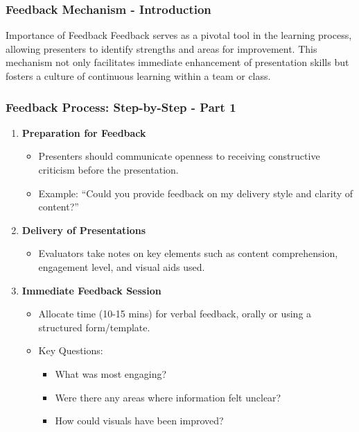 \documentclass[aspectratio=169]{beamer}
\begin{document}
\begin{frame}[fragile]
    \frametitle{Feedback Mechanism - Introduction}
    \begin{block}{Importance of Feedback}
        Feedback serves as a pivotal tool in the learning process, allowing presenters to identify strengths and areas for improvement. This mechanism not only facilitates immediate enhancement of presentation skills but fosters a culture of continuous learning within a team or class.
    \end{block}
\end{frame}

\begin{frame}[fragile]
    \frametitle{Feedback Process: Step-by-Step - Part 1}
    \begin{enumerate}
        \item \textbf{Preparation for Feedback}  
            \begin{itemize}
                \item Presenters should communicate openness to receiving constructive criticism before the presentation.
                \item Example: “Could you provide feedback on my delivery style and clarity of content?”
            \end{itemize}
        
        \item \textbf{Delivery of Presentations}  
            \begin{itemize}
                \item Evaluators take notes on key elements such as content comprehension, engagement level, and visual aids used.
            \end{itemize}
        
        \item \textbf{Immediate Feedback Session}  
            \begin{itemize}
                \item Allocate time (10-15 mins) for verbal feedback, orally or using a structured form/template.
                \item Key Questions:
                    \begin{itemize}
                        \item What was most engaging?
                        \item Were there any areas where information felt unclear?
                        \item How could visuals have been improved?
                    \end{itemize}
            \end{itemize}
    \end{enumerate}
\end{frame}
\end{document}
